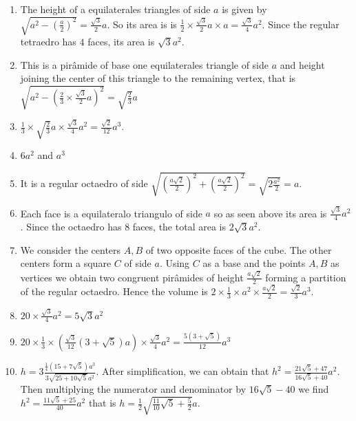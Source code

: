 \begin{enumerate}
\item The height of a equilaterales triangles of side $a$ is given by
  $\sqrt{a^2 - \left(\frac{a}{2}\right)^2} = \frac{\sqrt{3}}{2} a$.
  So its area is is $\frac{1}{2} \times {\frac{\sqrt{3}}{2} a} \times a =
  \frac{\sqrt{3}}{4}a^2$. Since the regular tetraedro has $4$ faces,
  its area is $\sqrt{3} a^2$.
\item This is a pirâmide of base one equilaterales triangle of side $a$ and
  height joining the center of this triangle to the remaining vertex, that is
  $\sqrt{a^2 - \left(\frac{2}{3} \times \frac{\sqrt{3}}{2} a\right)^2} =
  \sqrt{\frac{2}{3}} a$
\item $\frac{1}{3} \times \sqrt{\frac{2}{3}} a \times \frac{\sqrt{3}}{4}a^2 =
  \frac{\sqrt{2}}{12} a^3$.
\item $6a^2$ and $a^3$
\item It is a regular octaedro of side
  $\sqrt{\left(\frac{a \sqrt{2}}{2}\right)^2 + \left(\frac{a \sqrt{2}}{2}\right)^2} = \sqrt{2 \frac{a^2}{2}} = a$.
\item Each face is a equilateralo
  triangulo of side $a$ so as seen above its area is
  $\frac{\sqrt{3}}{4} a^2$. Since the octaedro has $8$ faces, the total
  area is $2 \sqrt{3} a^2$.
\item We consider the centers $A,B$ of two opposite faces of the cube. The
  other centers form a square $C$ of side $a$. Using $C$ as a base and
  the points $A,B$ as vertices we obtain two congruent pirâmides of height
  $\frac{a \sqrt{2}}{2}$ forming a
  partition of the regular octaedro. Hence the volume is
  $2 \times \frac{1}{3} \times a^2 \times \frac{a \sqrt{2}}{2} = \frac{ \sqrt{2} }{3}a^3$.
\item $20 \times \frac{\sqrt{3}}{4}a^2 = 5\sqrt{3}a^2$
\item $20 \times \frac{1}{3} \times
  \left(\frac{\sqrt{3}}{12} \left(3+\sqrt{5}\right) a\right) \times
  \frac{\sqrt{3}}{4}a^2 = \frac{5 \left(3+\sqrt{5}\right)}{12} a^3$
\item
  $h = 3 \frac{\frac{1}{4} \left(15+7\sqrt{5}\right) a^3}{3 \sqrt{25+10\sqrt{5}}a^2}$.
  After simplification, we can obtain that
  $h^2 = \frac{21\sqrt{5} + 47}{16\sqrt{5}+40} a^2$.
  Then multiplying the numerator and denominator by  $16\sqrt{5}-40$
  we find $h^2 = \frac{11 \sqrt{5} + 25}{40} a^2$ that is
  $h = \frac{1}{2} \sqrt{\frac{11}{10} \sqrt{5} + \frac{5}{2}} a$.

\end{enumerate}

